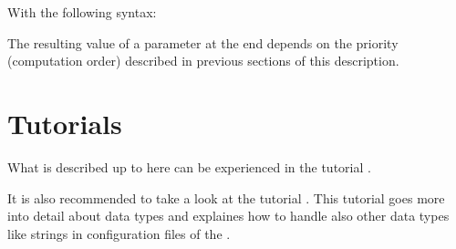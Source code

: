 With the following syntax:


The resulting value of a parameter at the end depends on the priority (computation order) described in previous sections of this description.

\newpage

\section{Tutorials}

What is described up to here can be experienced in the tutorial .

It is also recommended to take a look at the tutorial .
This tutorial goes more into detail about data types and explaines how to handle also other data types like strings in
configuration files of the \pkg.



